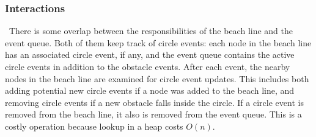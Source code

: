 \documentclass[conference]{IEEEtran}
\begin{document}
\subsubsection{Interactions}
\noindent\ There is some overlap between the responsibilities of the beach line and the event
queue. Both of them keep track of circle events: each node in the beach line
has an associated circle event, if any, and the event queue contains the
active circle events in addition to the obstacle events. After each event,
the nearby nodes in the beach line are examined for circle event updates. This
includes both adding potential new circle events if a node was added to the
beach line, and removing circle events if a new obstacle falls inside the
circle. If a circle event is removed from the beach line, it also is removed
from the event queue. This is a costly operation because lookup in a heap
costs $O(n)$.
\end{document}
